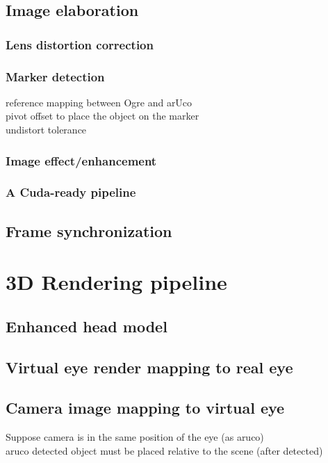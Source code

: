 \subsection{Image elaboration}

\subsubsection{Lens distortion correction}
\subsubsection{Marker detection}
reference mapping between Ogre and arUco\\
pivot offset to place the object on the marker\\
undistort tolerance\\

\subsubsection{Image effect/enhancement}

\subsubsection{A Cuda-ready pipeline}

\subsection{Frame synchronization}

\section{3D Rendering pipeline}

\subsection{Enhanced head model}

\subsection{Virtual eye render mapping to real eye}

\subsection{Camera image mapping to virtual eye}

Suppose camera is in the same position of the eye (as aruco) \\
aruco detected object must be placed relative to the scene (after detected) \\


